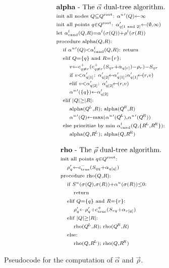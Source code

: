 \documentclass{article}
\newcommand{\kdroot}[1]{#1^{\text{\rm root}}}
\newcommand{\kdleft}[1]{#1^{\!L}}
\newcommand{\kdright}[1]{#1^{\!R}}
\newcommand{\X}{\\ \scriptstyle}
\newcommand{\x}{\\ \hspace{0.13in} \scriptstyle}
\newcommand{\xx}{\\ \hspace{0.26in} \scriptstyle}
\newcommand{\true}{\text{true}}
\newcommand{\ocpos}[1]{c^{+}_{#1}}
\newcommand{\ocneg}[1]{c^{-}_{#1}}
\newcommand{\cpos}[2]{\ocpos{#1 \neq #2}}
\newcommand{\simil}[2]{S_{#1#2}}
\newcommand{\vecrho}{\vec{\rho}}
\newcommand{\vecalpha}{\vec{\alpha}}
\newcommand{\frho}[1]{\rho_{#1}}
\newcommand{\falphaj}[2]{\alpha_{#1[#2]}}
\newcommand{\falphamax}{\alpha^{u}}
\newcommand{\falphamin}{\alpha^{l}}
\newcommand{\frhomin}{\rho^{l}}
\newcommand{\alphacand}{v}
\begin{document}
\begin{figure}
  \begin{minipage}{2.8in}
    \begin{equation*}
      \begin{array}{l}
        \text{{\bf alpha} - The }\vecalpha\text{ dual-tree algorithm.}
        \X \text{init all nodes }Q \subseteq \kdroot{Q}\text{: }\falphamax{'}(Q) \gets \infty
        \X \text{init all points }q \in \kdroot{Q}\text{: }\falphaj{q}{1\text{ and }2}' \gets (\emptyset, \infty)
        \X \text{let }\falphamin_{\text{cand}}(Q, R) = \falphamin(\sigma(Q)) + \frhomin(\sigma(R))
        \X \text{procedure alpha}(Q,R)\text{:}
        \x \text{if }\falphamax{'}(Q) < \falphamin_{\text{cand}}(Q, R)\text{: return}
        \x \text{elif }Q = \{q\} \text{ and } R = \{r\}\text{:}
        \xx \alphacand \gets \cpos{q}{r}(\cpos{q}{r}(\simil{q}{r} + \falphaj{q}{r}) - \frho{r}) - \simil{q}{r}
        \xx \text{if }\alphacand < \falphaj{q}{1}'\text{: } \falphaj{q}{2}' \!\gets\! \falphaj{q}{1}'; \falphaj{q}{1}' \!\gets\! (r, \alphacand)
        \xx \text{elif }\alphacand < \falphaj{q}{2}'\text{: } \falphaj{q}{2}' \!\gets\! (r, \alphacand)
        \xx \falphamax{'}(\{q\}) \gets \falphaj{q}{2}'
        \x \text{elif }|Q| \geq |R|\text{:}
        \xx \text{alpha}(\kdleft{Q}, R); \text{ alpha}(\kdright{Q}, R)
        \xx \falphamax{'}(Q) \gets \max(\falphamax{'}(\kdleft{Q}), \falphamax{'}(\kdright{Q}))
        \x \text{else prioritize by min }\falphamin_{\text{cand}}(Q,\{\kdleft{R}, \kdright{R}\}){:}
        \xx \text{alpha}(Q, \kdleft{R}); \text{ alpha}(Q, \kdright{R})
      \end{array}
    \end{equation*}
  \end{minipage}
  \begin{minipage}{2.5in}
    \begin{equation*}
      \begin{array}{l}
        \text{{\bf rho} - The }\vecrho\text{ dual-tree algorithm.}
        \X \text{init all points }q \in \kdroot{Q}\text{: }
        \x \frho{q}'\gets \ocneg{\true}(\simil{q}{q} + \falphaj{q}{q})
        \X \text{procedure rho}(Q,R)\text{:}
        \x \text{if }S^u(\sigma(Q),\sigma(R)) + \falphamax(\sigma(R)) \leq 0\text{:}
        \xx \text{return}
        \x \text{elif }Q = \{q\} \text{ and } R = \{r\}\text{:}
        \xx \frho{q}' \gets \frho{q}' + \ocpos{\true}(\simil{r}{q} + \falphaj{r}{q})
        \x \text{elif }|Q| \geq |R|\text{:}
        \xx \text{rho}(\kdleft{Q}, R); \text{ rho}(\kdright{Q}, R)
        \x \text{else:}
        \xx \text{rho}(Q, \kdleft{R}); \text{ rho}(Q, \kdright{R})
      \end{array}
    \end{equation*}
    \caption{\label{fig:alpharho}\footnotesize Pseudocode for the computation of
      $\vecalpha$ and $\vecrho$.}
  \end{minipage}
\end{figure}
\end{document}

